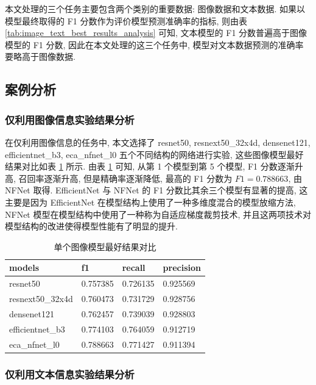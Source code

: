 \documentclass[12pt]{article}
\begin{document}
本文处理的三个任务主要包含两个类别的重要数据: 图像数据和文本数据. 如果以模型最终取得的 F1 分数作为评价模型预测准确率的指标, 则由表 \ref{tab:image_text_best_results_analysis} 可知, 文本模型的 F1 分数普遍高于图像模型的 F1 分数, 因此在本文处理的这三个任务中, 模型对文本数据预测的准确率要略高于图像数据.

\subsection{案例分析}

\subsubsection{仅利用图像信息实验结果分析}
  
在仅利用图像信息的任务中, 本文选择了 resnet50, resnext50\_32x4d, densenet121, efficientnet\_b3, eca\_nfnet\_l0 五个不同结构的网络进行实验, 这些图像模型最好结果对比如表 \ref{tab:image_best_results_analysis} 所示. 由表 \ref{tab:image_best_results_analysis} 可知, 从第 1 个模型到第 5 个模型, F1 分数逐渐升高, 召回率逐渐升高, 但是精确率逐渐降低, 最高的 F1 分数为 $F1=0.788663$, 由 NFNet 取得. EfficientNet 与 NFNet 的 F1 分数比其余三个模型有显著的提高, 这主要是因为 EfficientNet 在模型结构上使用了一种多维度混合的模型放缩方法, NFNet 模型在模型结构中使用了一种称为自适应梯度裁剪技术, 并且这两项技术对模型结构的改进使得模型性能有了明显的提升.

\begin{table}[htbp]
  \centering
  \caption{单个图像模型最好结果对比}
  \label{tab:image_best_results_analysis}
  \begin{tabular}{llll}
    \toprule
    models           & f1       & recall   & precision \\
    \midrule
    resnet50         & 0.757385 & 0.726135 & 0.925569  \\
    resnext50\_32x4d & 0.760473 & 0.731729 & 0.928756  \\
    densenet121      & 0.762457 & 0.739039 & 0.928803  \\
    efficientnet\_b3 & 0.774103 & 0.764059 & 0.912719  \\
    eca\_nfnet\_l0   & 0.788663 & 0.771427 & 0.911394 \\
    \bottomrule
  \end{tabular}
\end{table}

\subsubsection{仅利用文本信息实验结果分析}
\end{document}
